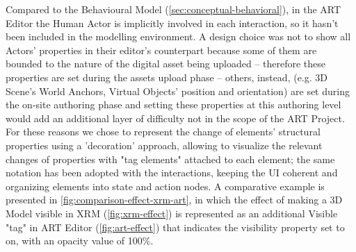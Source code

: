 Compared to the Behavioural Model (\autoref{sec:conceptual-behavioral}), in the ART Editor the Human Actor is implicitly involved in each interaction, so it hasn't been included in the modelling environment. A design choice was not to show all Actors' properties in their editor's counterpart because some of them are bounded to the nature of the digital asset being uploaded -- therefore these properties are set during the assets upload phase -- others, instead, (e.g. 3D Scene's World Anchors, Virtual Objects' position and orientation) are set during the on-site authoring phase and setting these properties at this authoring level would add an additional layer of difficulty not in the scope of the ART Project. For these reasons we chose to represent the change of elements' structural properties using a 'decoration' approach, allowing to visualize the relevant changes of properties with "tag elements" attached to each element; the same notation has been adopted with the interactions, keeping the \gls{UI} coherent and organizing elements into state and action nodes.
A comparative example is presented in \autoref{fig:comparison-effect-xrm-art}, in which the effect of making a 3D Model visible in XRM (\autoref{fig:xrm-effect}) is represented as an additional Visible "tag" in ART Editor (\autoref{fig:art-effect}) that indicates the visibility property set to on, with an opacity value of 100\%.
